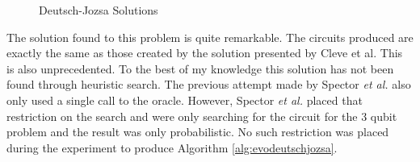 \begin{figure}
\centering
{}
\caption{Deutsch-Jozsa Solutions}
\end{figure}

The solution found to this problem is quite remarkable.
The circuits produced are exactly the same as those created by the solution presented by Cleve et al\cite{Cleve98quantumalgorithms}.
This is also unprecedented.
To the best of my knowledge this solution has not been found through heuristic search.
The previous attempt made by Spector \emph{et al.}\cite{LSpectorGPforQC,LSpectorANDOR,Spector:1999:QCA:316573.317112} also only used a single call to the oracle.
However, Spector \emph{et al.} placed that restriction on the search and were only searching for the circuit for the 3 qubit problem and the result was only probabilistic.
No such restriction was placed during the experiment to produce Algorithm \ref{alg:evodeutschjozsa}.


